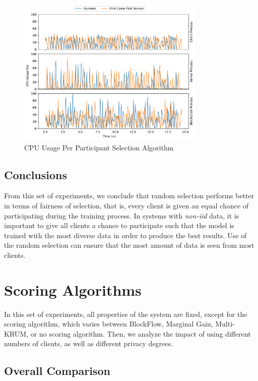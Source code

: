 \begin{figure}[!h]
    \centering
    \centering
    \includegraphics[width=0.8\textwidth]{graphics/selection/cpu.pdf}
    \caption{CPU Usage Per Participant Selection Algorithm}
    \label{fig:cpu_selection}
\end{figure}

\subsection{Conclusions}

From this set of experiments, we conclude that random selection performs better in terms of fairness of selection, that is, every client is given an equal chance of participating during the training process. In systems with \textit{non-iid} data, it is important to give all clients a chance to participate such that the model is trained with the most diverse data in order to produce the best results. Use of the random selection can ensure that the most amount of data is seen from most clients.

\section{Scoring Algorithms}

In this set of experiments, all properties of the system are fixed, except for the scoring algorithm, which varies between BlockFlow, Marginal Gain, Multi-KRUM, or no scoring algorithm. Then, we analyze the impact of using different numbers of clients, as well as different privacy degrees.

\subsection{Overall Comparison}\label{horizontal:scoring_overall}

